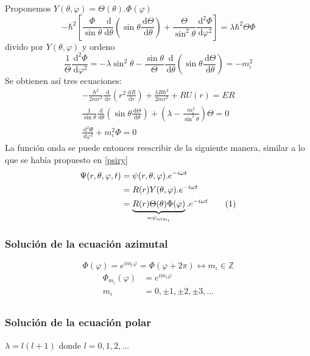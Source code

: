 \documentclass[10pt,twocolumn,titlepage]{article}
\newcommand\numberthis{\addtocounter{equation}{1}\tag{\theequation}}
\newcommand{\di}{\,\textrm{d}}
\newcommand{\nqm}{ m_{\iota} }
\newcommand{\nql}{l}
\newcommand{\nqn}{n}
\begin{document}
Proponemos $Y(\theta,\varphi)=\Theta(\theta).\Phi(\varphi)$
\begin{equation}
-\hbar^2 \left[ \frac{\Phi}{\sin\theta}\frac{\di}{\di \theta}\left( \sin\theta \frac{\di \Theta}{\di \theta} \right)+\frac{\Theta}{\sin^2\theta}\frac{\di^2 \Phi}{\di \varphi^2} \right]=\lambda \hbar^2\Theta \Phi
\end{equation}
divido por $Y(\theta,\varphi)$ y ordeno
\begin{equation*}
\frac{1}{\Theta}\frac{\di^2 \Phi}{\di\varphi^2}=-\lambda \sin^2 \theta -\frac{\sin\theta}{\Theta}\frac{\di}{\di\theta}\left( \sin\theta \frac{\di \Theta}{\di \theta}\right) = -\nqm^2
\end{equation*}
Se obtienen así tres ecuaciones:
\begin{align*}
-\frac{\hbar^2}{2m r^2}\frac{\di}{\di r}\left(r^2 \frac{\di R}{\di r}\right)+\frac{\lambda R \hbar^2}{2mr^2}+RU(r)=ER  \\
\frac{1}{\sin\theta}\frac{\di}{\di \theta}\left(\sin\theta \frac{\di \Theta}{\di\theta} \right)+\left(\lambda-\frac{\nqm^2}{\sin^2\theta} \right)\Theta =0 \\
\frac{\di^2 \Phi}{\di \varphi^2}+\nqm^2\Phi=0
\end{align*}
La función onda se puede entonces reescribir de la siguiente manera, similar a lo que se había propuesto en \ref{psiry}
\begin{align*}
\Psi(r,\theta,\varphi,t)&=\psi(r,\theta,\varphi).e^{-i\omega t} \\
&=R(r)Y(\theta,\varphi).e^{-i\omega t} \\
&=\underbrace{R(r)\Theta(\theta)\Phi(\varphi)}_{=\psi_{\nqn\nql\nqm}}.e^{-i\omega t} \numberthis \label{psiesfericas}
\end{align*}
\subsubsection*{Solución de la ecuación azimutal}
$$\Phi(\varphi)=e^{i\nqm\varphi}=\Phi(\varphi+2\pi)\leftrightarrow \nqm\in \mathbb{Z} $$
\begin{align*}
\Phi_{\nqm}(\varphi)&=e^{i\nqm\varphi} \\
\nqm &=0,\pm1,\pm2,\pm3, \ldots \\
\end{align*}

\subsubsection*{Solución de la ecuación polar}
$\lambda =\nql(\nql+1)$ donde $\nql=0,1,2,\ldots$
\end{document}
